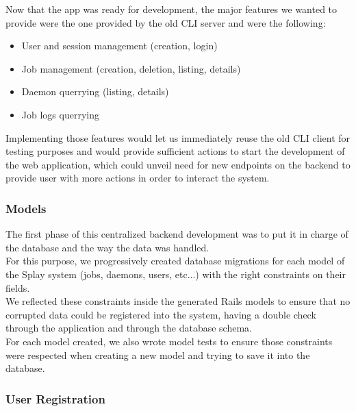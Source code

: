 \documentclass{eplmastersthesis}
\begin{document}
        Now that the app was ready for development, the major features
        we wanted to provide were the one provided by the old CLI server and
        were the following:

        \begin{itemize}
          \item User and session management (creation, login)
          \item Job management (creation, deletion, listing, details)
          \item Daemon querrying (listing, details)
          \item Job logs querrying
        \end{itemize}

        Implementing those features would let us immediately reuse the old
        CLI client for testing purposes and would provide sufficient actions
        to start the development of the web application, which could unveil
        need for new endpoints on the backend to provide user with more
        actions in order to interact the system.\\

        \subsubsection{Models}

          The first phase of this centralized backend development was to
          put it in charge of the database and the way the data was handled.\\

          For this purpose, we progressively created database migrations
          for each model of the Splay system (jobs, daemons, users, etc...)
          with the right constraints on their fields.\\
          We reflected these constraints inside the generated Rails models to
          ensure that no corrupted data could be registered into the system,
          having a double check through the application and through the
          database schema.\\
          For each model created, we also wrote model tests to ensure those
          constraints were respected when creating a new model and trying
          to save it into the database.

        \subsubsection{User Registration}
\end{document}
